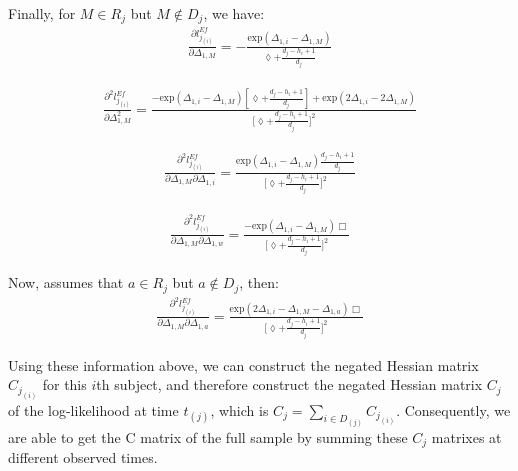 \documentclass[]{article}
\begin{document}
Finally, for \(M \in R_j\) but \(M \notin D_j\), we have:
\begin{equation}\begin{aligned}\label{eqn:Efron11}
\frac{\partial l_{j_{(i)}}^{Ef}}{\partial \Delta_{1,M}} = -\frac{\text{exp}(\Delta_{1,i}-\Delta_{1,M})}{\lozenge + \frac{d_j-h_i+1}{d_j}}
\end{aligned}\end{equation}

\begin{equation}\begin{aligned}\label{eqn:Efron12}
\frac{\partial^2 l_{j_{(i)}}^{Ef}}{\partial \Delta_{1,M}^2} = \frac{-\text{exp}(\Delta_{1,i}-\Delta_{1,M})[\lozenge+\frac{d_j-h_i+1}{d_j}]+\text{exp}(2\Delta_{1,i}-2\Delta_{1,M})}{\bigg[\lozenge + \frac{d_j-h_i+1}{d_j}\bigg]^2}
\end{aligned}\end{equation}

\begin{equation}\begin{aligned}\label{eqn:Efron13}
\frac{\partial^2 l_{j_{(i)}}^{Ef}}{\partial \Delta_{1,M}\partial \Delta_{1,i}} = \frac{\text{exp}(\Delta_{1,i}-\Delta_{1,M})\frac{d_j-h_i+1}{d_j}}{\bigg[\lozenge + \frac{d_j-h_i+1}{d_j}\bigg]^2}
\end{aligned}\end{equation}

\begin{equation}\begin{aligned}\label{eqn:Efron14}
\frac{\partial^2 l_{j_{(i)}}^{Ef}}{\partial \Delta_{1,M}\partial \Delta_{1,w}} = \frac{-\text{exp}(\Delta_{1,i}-\Delta_{1,M})\Box}{\bigg[\lozenge + \frac{d_j-h_i+1}{d_j}\bigg]^2}
\end{aligned}\end{equation}

Now, assumes that \(a\in R_j\) but \(a \notin D_j\), then:
\begin{equation}\begin{aligned}\label{eqn:Efron15}
\frac{\partial^2 l_{j_{(i)}}^{Ef}}{\partial \Delta_{1,M}\partial \Delta_{1,a}} = \frac{\text{exp}(2\Delta_{1,i}-\Delta_{1,M}-\Delta_{1,a})\Box}{\bigg[\lozenge + \frac{d_j-h_i+1}{d_j}\bigg]^2}
\end{aligned}\end{equation}

Using these information above, we can construct the negated Hessian
matrix \(C_{j_{(i)}}\) for this \(i\)th subject, and therefore construct
the negated Hessian matrix \(C_j\) of the log-likelihood at time
\(t_{(j)}\), which is \(C_j = \sum_{i\in D_{(j)}}C_{j_{(i)}}\).
Consequently, we are able to get the C matrix of the full sample by
summing these \(C_j\) matrixes at different observed times.
\end{document}
